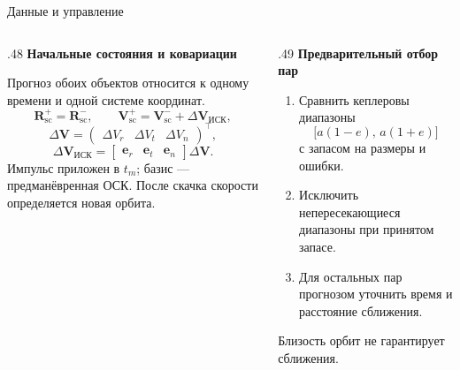 \documentclass[11pt,aspectratio=169,t]{beamer}
\newcommand{\eqcompact}{\fontsize{10}{12}\selectfont}
\newcommand{\derivationmathspacing}{%
  \setlength{\abovedisplayskip}{2pt}%
  \setlength{\belowdisplayskip}{3pt}%
  \setlength{\abovedisplayshortskip}{2pt}%
  \setlength{\belowdisplayshortskip}{2pt}%
  \setlength{\jot}{2pt}}
\newcommand{\vect}[1]{\boldsymbol{#1}}
\begin{document}
\begin{frame}{Данные и управление}
\relax\derivationmathspacing
\begin{columns}[T,onlytextwidth]
\begin{column}{.48\textwidth}
\textbf{Начальные состояния и ковариации}
\par\smallskip
Прогноз обоих объектов относится к одному времени и одной системе координат.
{\eqcompact\derivationmathspacing
\[
\vect R_{\mathrm{sc}}^+=\vect R_{\mathrm{sc}}^-,\qquad
\vect V_{\mathrm{sc}}^+=\vect V_{\mathrm{sc}}^-+
\Delta\vect V_{\text{ИСК}},
\]
\[
\Delta\vect V=
\begin{pmatrix}\Delta V_r&\Delta V_t&\Delta V_n\end{pmatrix}^{\!\top},
\]
\[
\Delta\vect V_{\text{ИСК}}=
\begin{bmatrix}\vect e_r&\vect e_t&\vect e_n\end{bmatrix}\Delta\vect V.
\]
}
Импульс приложен в $t_m$; базис --- предманёвренная ОСК.
После скачка скорости определяется новая орбита.
\end{column}
\begin{column}{.49\textwidth}
\textbf{Предварительный отбор пар}
\begin{enumerate}
\setlength{\itemsep}{2pt}
\item Сравнить кеплеровы диапазоны
{\eqcompact\[
\bigl[a(1-e),\,a(1+e)\bigr]
\]}
с запасом на размеры и ошибки.
\item Исключить непересекающиеся диапазоны при принятом запасе.
\item Для остальных пар прогнозом уточнить время и расстояние сближения.
\end{enumerate}
Близость орбит не гарантирует сближения.
\end{column}
\end{columns}
\end{frame}
\end{document}
